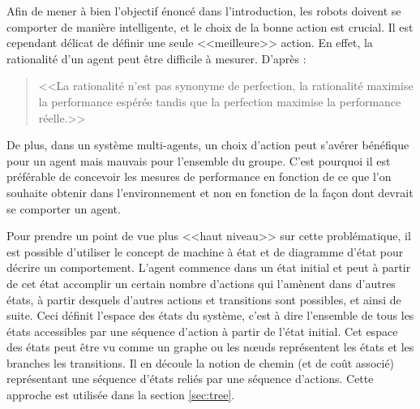 Afin de mener à bien l'objectif énoncé dans l'introduction, les robots doivent se comporter de manière intelligente, et le choix de la bonne action est crucial. Il est cependant délicat de définir une seule <<meilleure>> action. En effet, la rationalité d'un agent peut être difficile à mesurer. D'après \cite{AIBrique}:
\begin{quote}
  <<La rationalité n'est pas synonyme de perfection, la rationalité maximise la performance espérée tandis que la perfection maximise la performance réelle.>>
\end{quote}

De plus, dans un système multi-agents, un choix d'action peut s'avérer bénéfique pour un agent mais mauvais pour l'ensemble du groupe. C'est pourquoi il est préférable de concevoir les mesures de performance en fonction de ce que l'on souhaite obtenir dans l'environnement et non en fonction de la façon dont devrait se comporter un agent.

Pour prendre un point de vue plus <<haut niveau>> sur cette problématique, il est possible d'utiliser le concept de machine à état et de diagramme d'état pour décrire un comportement. L'agent commence dans un état initial et peut à partir de cet état accomplir un certain nombre d'actions qui l'amènent dans d'autres états, à partir desquels d'autres actions et transitions sont possibles, et ainsi de suite. Ceci définit l'espace des états du système, c'est à dire l'ensemble de tous les états accessibles par une séquence d'action à partir de l'état initial. Cet espace des états peut être vu comme un graphe ou les n\oe{}uds représentent les états et les branches les transitions. Il en découle la notion de chemin (et de coût associé) représentant une séquence d'états reliés par une séquence d'actions. Cette approche est utilisée dans la section \ref{sec:tree}.~\cite{foraging, AIBrique}

